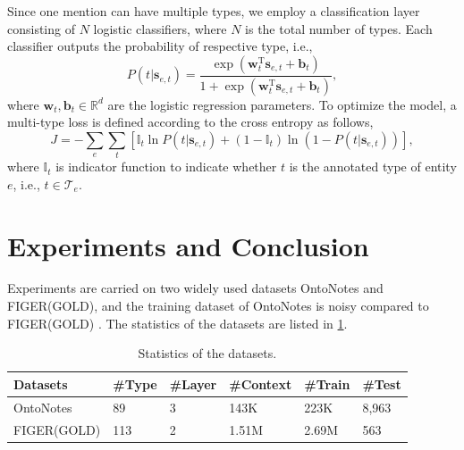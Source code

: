 \documentclass[letterpaper]{article} %
\begin{document}
Since one mention can have multiple types, we employ a classification layer consisting of $N$ logistic classifiers, where $N$ is the total number of types. Each classifier outputs the probability of respective type, i.e.,
\[
P(t|\mathbf{s}_{e,t})=\frac{\exp(\mathbf{w}_{t}^\mathrm{T} \mathbf{s}_{e,t}+\mathbf{b}_{t})}{1+\exp(\mathbf{w}_{t}^\mathrm{T} \mathbf{s}_{e,t}+\mathbf{b}_{t})},
\]
where $\mathbf{w}_{t}, \mathbf{b}_{t}  \in \mathbb{R}^{d}$ are the logistic regression parameters. %
To optimize the model, a multi-type loss is defined according to the cross entropy as follows,
\[
J=-\sum_{e} \sum_{t} [\mathbb{I}_{t}\ln P(t|\mathbf{s}_{e,t})+(1-\mathbb{I}_{t})\ln(1-P(t|\mathbf{s}_{e,t}))],
\]
where $\mathbb{I}_t$ is indicator function to indicate whether $t$ is the annotated type of entity $e$, i.e., $t\in \mathcal{T}_e$.

\section{Experiments and Conclusion}
Experiments are carried on two widely used datasets OntoNotes and FIGER(GOLD), and the training dataset of OntoNotes is noisy compared to FIGER(GOLD) \cite{Shimaoka2016Neural}. The statistics of the datasets are listed in \tablename \ref{dataset}. %
\begin{table}[h!]
\small
\centering
\caption{Statistics of the datasets.}
\begin{tabular}{p{1.9cm}|p{0.75cm}p{0.75cm}p{0.83cm}p{0.78cm}p{0.78cm}}
\hline
Datasets & \#Type &\#Layer & \#Context & \#Train & \#Test  \\
\hline
OntoNotes & 89 & 3& 143K & 223K & 8,963  \\
FIGER(GOLD) &  113 & 2& 1.51M & 2.69M & 563  \\
\hline
\end{tabular}
\label{dataset}
\end{table}
\end{document}
